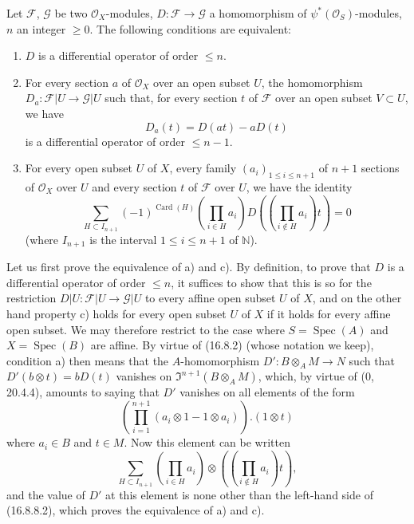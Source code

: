 \begin{proposition}[16.8.8]
\label{IV.16.8.8}
Let $\mathscr{F}$, $\mathscr{G}$ be two $\mathcal{O}_X$-modules,
$D:\mathscr{F}\to\mathscr{G}$ a homomorphism of
$\psi^*(\mathcal{O}_S)$-modules, $n$ an integer $\geq0$. The following
conditions are equivalent:
\begin{enumerate}
  \item[(a)] $D$ is a differential operator of order $\leq n$.
  \item[(b)] For every section $a$ of $\mathcal{O}_X$ over an open subset
  $U$, the homomorphism $D_a:\mathscr{F}|U\to\mathscr{G}|U$ such that, for
  every section $t$ of $\mathscr{F}$ over an open subset $V\subset U$, we
  have
  \[
    D_a(t)=D(at)-aD(t)
    \tag{16.8.8.1}
    \label{IV.16.8.8.1}
  \]
  is a differential operator of order $\leq n-1$.
  \item[(c)] For every open subset $U$ of $X$, every family
  $(a_i)_{1\leq i\leq n+1}$ of $n+1$ sections of $\mathcal{O}_X$ over
  $U$ and every section $t$ of $\mathscr{F}$ over $U$, we have
  the identity
  \[
    \sum_{H\subset I_{n+1}}(-1)^{\operatorname{Card}(H)}
    \left(\prod_{i\in H}a_i\right)
    D\!\left(\left(\prod_{i\notin H}a_i\right)t\right)=0
    \tag{16.8.8.2}
    \label{IV.16.8.8.2}
  \]
  (where $I_{n+1}$ is the interval $1\leq i\leq n+1$ of $\mathbb{N}$).
\end{enumerate}
\end{proposition}

Let us first prove the equivalence of a) and c). By definition, to prove that
$D$ is a differential operator of order $\leq n$, it suffices to show that
this is so for the restriction
$D|U:\mathscr{F}|U\to\mathscr{G}|U$ to every affine open subset $U$ of $X$,
and on the other hand property c) holds for every open subset $U$ of $X$ if
it holds for every affine open subset. We may therefore restrict to the case
where $S=\operatorname{Spec}(A)$ and $X=\operatorname{Spec}(B)$ are affine.
By virtue of (16.8.2) (whose notation we keep), condition a) then means
that the $A$-homomorphism $D':B\otimes_A M\to N$ such that
$D'(b\otimes t)=bD(t)$ vanishes on
$\mathfrak{I}^{n+1}(B\otimes_A M)$, which, by virtue of (0, 20.4.4), amounts
to saying that $D'$ vanishes on all elements of the form
\[
  \left(\prod_{i=1}^{n+1}(a_i\otimes1-1\otimes a_i)\right).(1\otimes t)
\]
where $a_i\in B$ and $t\in M$. Now this element can be written
\[
  \sum_{H\subset I_{n+1}}
  \left(\prod_{i\in H}a_i\right)\otimes
  \left(\left(\prod_{i\notin H}a_i\right)t\right),
\]
and the value of $D'$ at this element is none other than the left-hand side
of (16.8.8.2), which proves the equivalence of a) and c).

